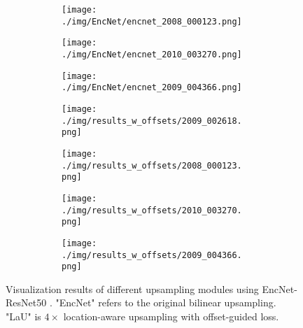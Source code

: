 \documentclass[10pt,twocolumn,letterpaper]{article}
\begin{document}
\begin{figure}
\begin{subfigure}[t]{0.11\textwidth}
        \begin{subfigure}[t]{\textwidth}
                \texttt{[image: ./img/EncNet/encnet\_2008\_000123.png]}
            \end{subfigure}\vspace{.6ex}

        \begin{subfigure}[t]{\textwidth}
                \texttt{[image: ./img/EncNet/encnet\_2010\_003270.png]}
            \end{subfigure}\vspace{.6ex}

            \begin{subfigure}[t]{\textwidth}
                \texttt{[image: ./img/EncNet/encnet\_2009\_004366.png]}
            \captionsetup{justification=centering}
        \label{7c}
            \end{subfigure}
    \end{subfigure}
\begin{subfigure}[t]{0.11\textwidth}
        \begin{subfigure}[t]{\textwidth}
                \texttt{[image: ./img/results\_w\_offsets/2009\_002618.png]}
            \end{subfigure}\vspace{.6ex}

        \begin{subfigure}[t]{\textwidth}
                \texttt{[image: ./img/results\_w\_offsets/2008\_000123.png]}
            \end{subfigure}\vspace{.6ex}

        \begin{subfigure}[t]{\textwidth}
                \texttt{[image: ./img/results\_w\_offsets/2010\_003270.png]}
            \end{subfigure}\vspace{.6ex}

            \begin{subfigure}[t]{\textwidth}
                \texttt{[image: ./img/results\_w\_offsets/2009\_004366.png]}
        \label{7d}
            \end{subfigure}
    \end{subfigure}
        \caption{Visualization results of different upsampling modules using EncNet-ResNet50 \cite{EncNet}. "EncNet" refers to the original bilinear upsampling. "LaU" is $4\times$ location-aware upsampling with offset-guided loss.}
\label{view}
\end{figure}
\end{document}
